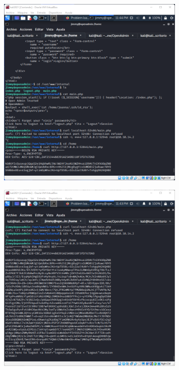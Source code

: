 \documentclass{article}
\begin{document}
\begin{figure}[h]
	\center
	\includegraphics[width=0.8\textwidth]{images/openadmin/14-mainphp.png}
	\caption{}
\end{figure}

\begin{figure}[h]
	\center
	\includegraphics[width=0.8\textwidth]{images/openadmin/15-joannarsa.png}
	\caption{}
\end{figure}
\end{document}

